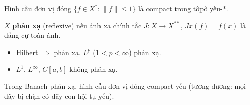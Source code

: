 \documentclass[12pt,a4paper]{article}
\begin{document}
\begin{dinhly}[title={Định lý Banach--Alaoglu}]
  Hình cầu đơn vị đóng $\{f \in X^* : \|f\| \le 1\}$ là compact trong tôpô yếu-$*$.
\end{dinhly}

\begin{dinhly}[title={Không gian phản xạ}]
  $X$ \textbf{phản xạ} (reflexive) nếu ánh xạ chính tắc $J: X \to X^{**}$, $Jx(f) = f(x)$ là đẳng cự toàn ánh.
  \begin{itemize}
    \item Hilbert $\Rightarrow$ phản xạ. $L^p$ ($1 < p < \infty$) phản xạ.
    \item $L^1$, $L^\infty$, $C[a,b]$ không phản xạ.
  \end{itemize}
\end{dinhly}

\begin{dinhly}[title={Eberlein--Šmulian}]
  Trong Banach phản xạ, hình cầu đơn vị đóng compact yếu (tương đương: mọi dãy bị chặn có dãy con hội tụ yếu).
\end{dinhly}
\end{document}
